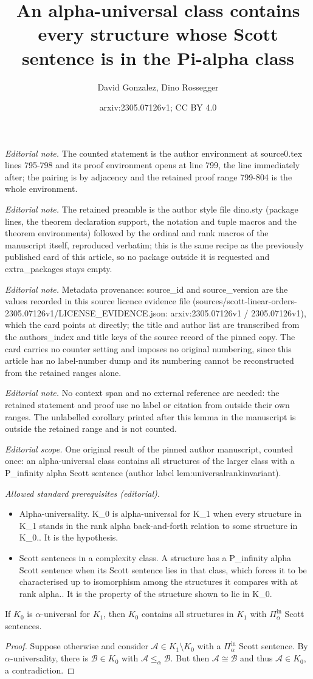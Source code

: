 \documentclass[10pt,a4paper]{amsart}
\title{An alpha-universal class contains every structure whose Scott sentence is in the Pi-alpha class}
\author{David Gonzalez, Dino Rossegger}
\date{arxiv:2305.07126v1; CC BY 4.0}
\providecommand{\A}{\mathcal{A}}
\providecommand{\B}{\mathcal{B}}
\providecommand{\Pinf}[1]{\Pi^{\mathrm{in}}_{#1}}
\begin{document}
\maketitle
\noindent\textit{Editorial note.} The counted statement is the author environment at source0.tex lines 795-798 and its proof environment opens at line 799, the line immediately after; the pairing is by adjacency and the retained proof range 799-804 is the whole environment.\par\medskip
\noindent\textit{Editorial note.} The retained preamble is the author style file dino.sty (package lines, the theorem declaration support, the notation and tuple macros and the theorem environments) followed by the ordinal and rank macros of the manuscript itself, reproduced verbatim; this is the same recipe as the previously published card of this article, so no package outside it is requested and extra\_packages stays empty.\par\medskip
\noindent\textit{Editorial note.} Metadata provenance: source\_id and source\_version are the values recorded in this source licence evidence file (sources/scott-linear-orders-2305.07126v1/LICENSE\_EVIDENCE.json: arxiv:2305.07126v1 / 2305.07126v1), which the card points at directly; the title and author list are transcribed from the authors\_index and title keys of the source record of the pinned copy. The card carries no counter setting and imposes no original numbering, since this article has no label-number dump and its numbering cannot be reconstructed from the retained ranges alone.\par\medskip
\noindent\textit{Editorial note.} No context span and no external reference are needed: the retained statement and proof use no label or citation from outside their own ranges. The unlabelled corollary printed after this lemma in the manuscript is outside the retained range and is not counted.\par\medskip
\noindent\textit{Editorial scope.} One original result of the pinned author manuscript, counted once: an alpha-universal class contains all structures of the larger class with a P\_infinity alpha Scott sentence (author label lem:universalrankinvariant).\par\medskip
\noindent\textit{Allowed standard prerequisites (editorial).}\begin{itemize}
\item Alpha-universality. K\_0 is alpha-universal for K\_1 when every structure in K\_1 stands in the rank alpha back-and-forth relation to some structure in K\_0.. It is the hypothesis.
\item Scott sentences in a complexity class. A structure has a P\_infinity alpha Scott sentence when its Scott sentence lies in that class, which forces it to be characterised up to isomorphism among the structures it compares with at rank alpha.. It is the property of the structure shown to lie in K\_0.
\end{itemize}\medskip
\begin{lemma}\label{lem:universalrankinvariant}
  If $K_0$ is $\alpha$-universal for $K_1$, then $K_0$ contains all structures
  in $K_1$ with $\Pinf{\alpha}$ Scott sentences.
\end{lemma}

\begin{proof}
  Suppose otherwise and consider $\A\in K_1\setminus K_0$ with a $\Pinf{\alpha}$
  Scott sentence. By $\alpha$-universality, there is $\B\in K_0$ with
  $\A\leq_\alpha\B$. But then $\A\cong \B$ and thus $\A\in K_0$, a
  contradiction.
\end{proof}
\end{document}
